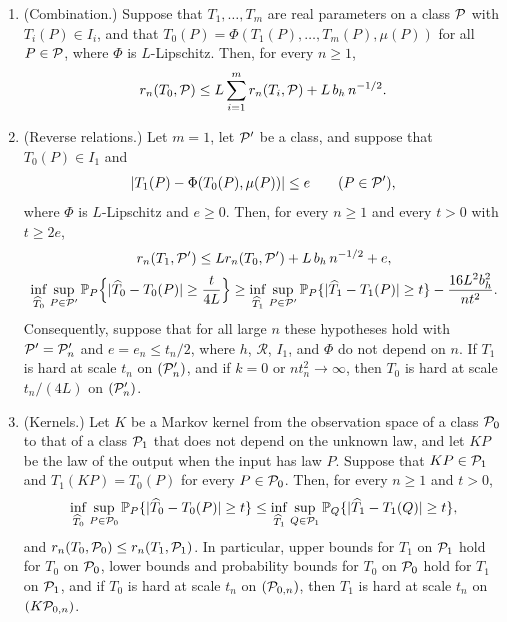 \begin{lemma}[Reductions]\label{lem:reductions}
\leavevmode
\begin{enumerate}[label=(\alph*)]
\item (Combination.) Suppose that $T_1,\ldots,T_m$ are real parameters
on a class $\mathcal P$ with $T_i(P)\in I_i$, and that
$T_0(P)=\Phi(T_1(P),\ldots,T_m(P),\mu(P))$ for all $P\in\mathcal P$, where
$\Phi$ is $L$-Lipschitz. Then, for every $n\ge1$,
\[
 r_n(T_0,\mathcal P)\le L\sum_{i=1}^mr_n(T_i,\mathcal P)+L\,b_h\,n^{-1/2}.
\]
\item (Reverse relations.) Let $m=1$, let $\mathcal P'$ be a class, and
suppose that $T_0(P)\in I_1$ and
\begin{equation}\label{eq:transfer-relation}
 |T_1(P)-\Phi(T_0(P),\mu(P))|\le e\qquad(P\in\mathcal P'),
\end{equation}
where $\Phi$ is $L$-Lipschitz and $e\ge0$. Then, for every $n\ge1$ and
every $t>0$ with $t\ge2e$,
\begin{gather}
 r_n(T_1,\mathcal P')\le Lr_n(T_0,\mathcal P')+L\,b_h\,n^{-1/2}+e,
 \label{eq:transfer-rmse}\\
 \inf_{\widehat T_0}\sup_{P\in\mathcal P'}
 \mathbb P_P\Bigl\{|\widehat T_0-T_0(P)|\ge\frac t{4L}\Bigr\}
 \ge\inf_{\widehat T_1}\sup_{P\in\mathcal P'}
 \mathbb P_P\{|\widehat T_1-T_1(P)|\ge t\}-\frac{16L^2b_h^2}{nt^2}.
 \label{eq:moment-probability-transfer}
\end{gather}
Consequently, suppose that for all large $n$ these hypotheses hold
with $\mathcal P'=\mathcal P'_n$ and $e=e_n\le t_n/2$, where $h$, $\mathcal R$,
$I_1$, and $\Phi$ do not depend on $n$. If $T_1$ is hard at scale $t_n$
on $(\mathcal P'_n)$, and if $k=0$ or $nt_n^2\to\infty$, then $T_0$ is hard at
scale $t_n/(4L)$ on $(\mathcal P'_n)$.
\item (Kernels.) Let $K$ be a Markov kernel from the observation space
of a class $\mathcal P_0$ to that of a class $\mathcal P_1$ that does not depend on
the unknown law, and let $KP$ be the law of the output when the input
has law $P$. Suppose that $KP\in\mathcal P_1$ and $T_1(KP)=T_0(P)$ for every
$P\in\mathcal P_0$. Then, for every $n\ge1$ and $t>0$,
\[
 \inf_{\widehat T_0}\sup_{P\in\mathcal P_0}\mathbb P_P\{|\widehat T_0-T_0(P)|\ge t\}
 \le\inf_{\widehat T_1}\sup_{Q\in\mathcal P_1}\mathbb P_Q\{|\widehat T_1-T_1(Q)|\ge t\},
\]
and $r_n(T_0,\mathcal P_0)\le r_n(T_1,\mathcal P_1)$. In particular, upper
bounds for $T_1$ on $\mathcal P_1$ hold for $T_0$ on $\mathcal P_0$, lower bounds
and probability bounds for $T_0$ on $\mathcal P_0$ hold for $T_1$ on $\mathcal P_1$,
and if $T_0$ is hard at scale $t_n$ on $(\mathcal P_{0,n})$, then $T_1$ is
hard at scale $t_n$ on $(K\mathcal P_{0,n})$.
\end{enumerate}
\end{lemma}


